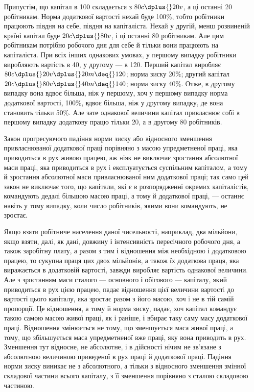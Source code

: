 Припустім, що капітал в 100 складається з $80c \dplus{} 20v$, а ці
останні \deq{} 20 робітникам. Норма додаткової вартості нехай буде
100\%, тобто робітники працюють півдня на себе, півдня на капіталіста.
Нехай у другій, менш розвиненій країні капітал буде
$20c \dplus{} 80v$, і ці останні \deq{} 80 робітникам. Але цим робітникам потрібно
 робочого дня для себе й тільки  вони працюють на
капіталіста. При всіх інших однакових умовах, у першому випадку
робітники виробляють вартість в 40, у другому — в 120.
Перший капітал виробляє $80c \dplus{} 20v \dplus{} 20m \deq{} 120$; норма зиску \deq{}
20\%; другий капітал $20c \dplus{} 80v \dplus{} 40m \deq{} 140$; норма зиску
\deq{} 40\%. Отже, в другому випадку вона вдвоє більша, ніж у першому,
хоч у першому випадку норма додаткової вартості, \deq{} 100\%,
вдвоє більша, ніж у другому випадку, де вона становить тільки
50\%. Але зате однакової величини капітал привласнює собі в першому
випадку додаткову працю тільки 20, а в другому 80 робітників.

Закон прогресуючого падіння норми зиску або відносного
зменшення привласнюваної додаткової праці порівняно з масою
упредметненої праці, яка приводиться в рух живою працею, аж
ніяк не виключає зростання абсолютної маси праці, яка приводиться
в рух і експлуатується суспільним капіталом, а тому й зростання
абсолютної маси привласнюваної ним додаткової праці; так само
цей закон не виключає того, що капітали, які є в розпорядженні
окремих капіталістів, командують дедалі більшою масою праці,
а тому й додаткової праці, — останнє навіть у тому випадку,
коли число робітників, якими вони командують, не зростає.

Якщо взяти робітниче населення даної чисельності, наприклад,
два мільйони, якщо взяти, далі, як дані, довжину і інтенсивність
пересічного робочого дня, а також заробітну плату,
а разом з тим і відношення між необхідною і додатковою працею,
то сукупна праця цих двох мільйонів, а також їх додаткова
праця, яка виражається в додатковій вартості, завжди виробляє
вартість однакової величини. Але з зростанням маси сталого
— основного і обігового — капіталу, який приводиться в рух
цією працею, падає відношення цієї величини вартості до вартості
цього капіталу, яка зростає разом з його масою, хоч і не в тій
самій пропорції. Це відношення, а тому й норма зиску, падає, хоч
капітал командує такою самою масою живої праці, як і раніше,
і вбирає таку саму масу додаткової праці. Відношення змінюється
не тому, що зменшується маса живої праці, а тому, що збільшується
маса упредметненої вже праці, яку вона приводить в рух.
Зменшення тут відносне, не абсолютне, і в дійсності нічим
не зв’язане з абсолютною величиною приведеної в рух праці
й додаткової праці. Падіння норми зиску виникає не з абсолютного,
а тільки з відносного зменшення змінної складової частини
всього капіталу, з її зменшення порівняно з сталою складовою
частиною.

